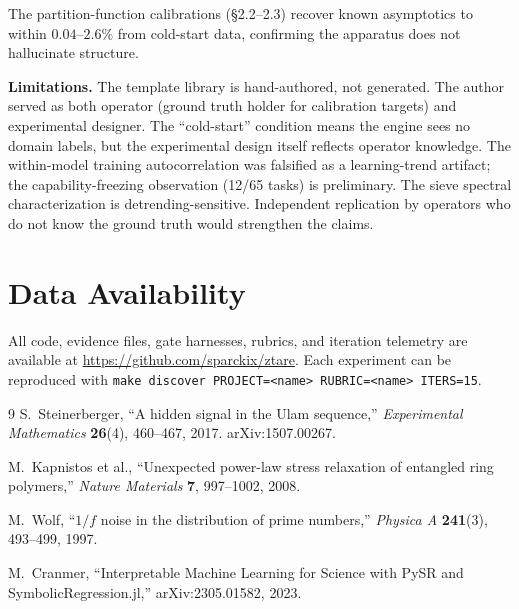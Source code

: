 \documentclass[12pt]{article}
\begin{document}
The partition-function calibrations (\S2.2--2.3) recover known asymptotics to within $0.04$--$2.6\%$ from cold-start data, confirming the apparatus does not hallucinate structure.

\textbf{Limitations.} The template library is hand-authored, not generated. The author served as both operator (ground truth holder for calibration targets) and experimental designer. The ``cold-start'' condition means the engine sees no domain labels, but the experimental design itself reflects operator knowledge. The within-model training autocorrelation was falsified as a learning-trend artifact; the capability-freezing observation (12/65 tasks) is preliminary. The sieve spectral characterization is detrending-sensitive. Independent replication by operators who do not know the ground truth would strengthen the claims.

\section*{Data Availability}

All code, evidence files, gate harnesses, rubrics, and iteration telemetry are available at \url{https://github.com/sparckix/ztare}. Each experiment can be reproduced with \texttt{make discover PROJECT=<name> RUBRIC=<name> ITERS=15}.

\begin{thebibliography}{9}
S.~Steinerberger, ``A hidden signal in the Ulam sequence,'' \emph{Experimental Mathematics} \textbf{26}(4), 460--467, 2017. arXiv:1507.00267.

M.~Kapnistos et al., ``Unexpected power-law stress relaxation of entangled ring polymers,'' \emph{Nature Materials} \textbf{7}, 997--1002, 2008.

M.~Wolf, ``$1/f$ noise in the distribution of prime numbers,'' \emph{Physica A} \textbf{241}(3), 493--499, 1997.

M.~Cranmer, ``Interpretable Machine Learning for Science with PySR and SymbolicRegression.jl,'' arXiv:2305.01582, 2023.
\end{thebibliography}
\end{document}
